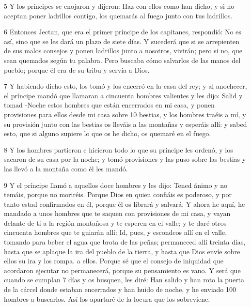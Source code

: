 \par 5 Y los príncipes se enojaron y dijeron: Haz con ellos como han dicho, y si no aceptan poner ladrillos contigo, los quemarás al fuego junto con tus ladrillos.

\par 6 Entonces Jectan, que era el primer príncipe de los capitanes, respondió: No es así, sino que se les dará un plazo de siete días. Y sucederá que si se arrepienten de sus malos consejos y ponen ladrillos junto a nosotros, vivirán; pero si no, que sean quemados según tu palabra. Pero buscaba cómo salvarlos de las manos del pueblo; porque él era de su tribu y servía a Dios.

\par 7 Y habiendo dicho esto, los tomó y los encerró en la casa del rey; y al anochecer, el príncipe mandó que llamaran a cincuenta hombres valientes y les dijo: Salid y tomad -Noche estos hombres que están encerrados en mi casa, y ponen provisiones para ellos desde mi casa sobre 10 bestias, y los hombres traéis a mí, y su provisión junto con las bestias os lleváis a las montañas y esperáis allí: y sabed esto, que si alguno supiere lo que os he dicho, os quemaré en el fuego.

\par 8 Y los hombres partieron e hicieron todo lo que su príncipe les ordenó, y los sacaron de su casa por la noche; y tomó provisiones y las puso sobre las bestias y las llevó a la montaña como él les mandó.

\par 9 Y el príncipe llamó a aquellos doce hombres y les dijo: Tened ánimo y no temáis, porque no moriréis. Porque Dios en quien confiáis es poderoso, y por tanto estad confirmados en él, porque él os librará y salvará. Y ahora he aquí, he mandado a unos hombres que te saquen con provisiones de mi casa, y vayan delante de ti a la región montañosa y te esperen en el valle; y te daré otros cincuenta hombres que te guiarán allí: Id, pues, y escondeos allí en el valle, tomando para beber el agua que brota de las peñas; permaneced allí treinta días, hasta que se aplaque la ira del pueblo de la tierra, y hasta que Dios envíe sobre ellos su ira y los rompa. a ellos. Porque sé que el consejo de iniquidad que acordaron ejecutar no permanecerá, porque su pensamiento es vano. Y será que cuando se cumplan 7 días y os busquen, les diré: Han salido y han roto la puerta de la cárcel donde estaban encerrados y han huido de noche, y he enviado 100 hombres a buscarlos. Así los apartaré de la locura que los sobreviene.

